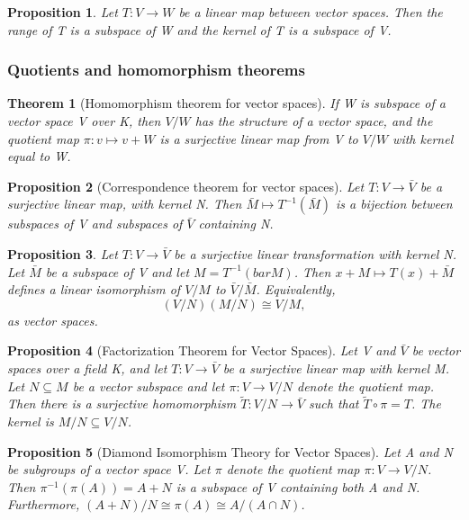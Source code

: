 \documentclass[12pt]{article}
\newtheorem{theorem}{Theorem}[subsection]
\newtheorem{proposition}{Proposition}[subsection]
\begin{document}
        \begin{proposition}
            Let $T : V \rightarrow W$ be a linear map between vector spaces. Then the range of T is a subspace of W and the kernel of T is a subspace of V.
        \end{proposition}
        \subsubsection{Quotients and homomorphism theorems}
            \begin{theorem}[Homomorphism theorem for vector spaces]
                If W is subspace of a vector space V over K, then $V/W$ has the structure of a vector space, and the quotient map $\pi: v \mapsto v + W$ is a surjective linear map from V to $V/W$ with kernel equal to W.
            \end{theorem}

            \begin{proposition}[Correspondence theorem for vector spaces]
                Let $T: V \rightarrow \bar{V}$ be a surjective linear map, with kernel N. Then $\bar{M} \mapsto T^{-1}(\bar{M})$ is a bijection between subspaces of V and subspaces of $\bar{V}$ containing N.
            \end{proposition}

            \begin{proposition}
                Let $T: V \rightarrow \bar{V}$ be a surjective linear transformation with kernel N. Let $\bar{M}$ be a subspace of V and let $M = T^{-1}(bar{M})$. Then $x + M \mapsto T(x) +  \bar{M}$ defines a linear isomorphism of $V/M$ to $\bar{V}/\bar{M}$. Equivalently,
                    \[(V/N)(M/N) \cong V/M,\]
                as vector spaces.
            \end{proposition}

            \begin{proposition}[Factorization Theorem for Vector Spaces]
                Let V and $\bar{V}$ be vector spaces over a field K, and let $T: V \rightarrow \bar{V}$ be a surjective linear map with kernel M. Let $N \subseteq M$ be a vector subspace and let $\pi: V \rightarrow V/N$ denote the quotient map. Then there is a surjective homomorphism $\tilde{T}: V/N \rightarrow \bar{V}$ such that $\tilde{T} \circ \pi = T$. The kernel is $M/N \subseteq V/N$.
            \end{proposition}
            \begin{proposition}[Diamond Isomorphism Theory for Vector Spaces]
                Let A and N be subgroups of a vector space V. Let $\pi$ denote the quotient map $\pi: V \rightarrow V/N$. Then $\pi^{-1}(\pi(A)) = A + N$ is a subspace of V containing both A and N. Furthermore, $(A + N)/N \cong \pi(A) \cong A/(A \cap N)$.
            \end{proposition}
\end{document}
